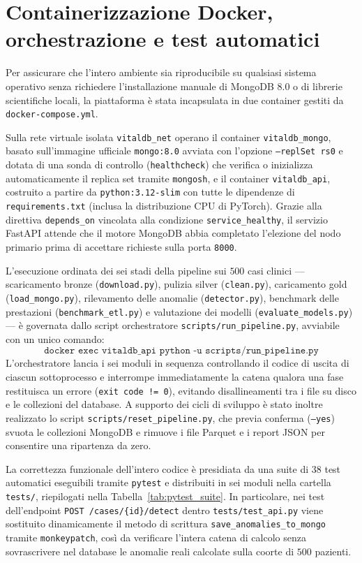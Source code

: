 \section{Containerizzazione Docker, orchestrazione e test automatici}
Per assicurare che l'intero ambiente sia riproducibile su qualsiasi sistema operativo senza richiedere l'installazione manuale di MongoDB 8.0 o di librerie scientifiche locali, la piattaforma \`e stata incapsulata in due container gestiti da \texttt{docker-compose.yml}.

Sulla rete virtuale isolata \texttt{vitaldb\_net} operano il container \texttt{vitaldb\_mongo}, basato sull'immagine ufficiale \texttt{mongo:8.0} avviata con l'opzione \texttt{--replSet rs0} e dotata di una sonda di controllo (\texttt{healthcheck}) che verifica o inizializza automaticamente il replica set tramite \texttt{mongosh}, e il container \texttt{vitaldb\_api}, costruito a partire da \texttt{python:3.12-slim} con tutte le dipendenze di \texttt{requirements.txt} (inclusa la distribuzione CPU di PyTorch). Grazie alla direttiva \texttt{depends\_on} vincolata alla condizione \texttt{service\_healthy}, il servizio FastAPI attende che il motore MongoDB abbia completato l'elezione del nodo primario prima di accettare richieste sulla porta \texttt{8000}.

L'esecuzione ordinata dei sei stadi della pipeline sui $500$ casi clinici — scaricamento bronze (\texttt{download.py}), pulizia silver (\texttt{clean.py}), caricamento gold (\texttt{load\_mongo.py}), rilevamento delle anomalie (\texttt{detector.py}), benchmark delle prestazioni (\texttt{benchmark\_etl.py}) e valutazione dei modelli (\texttt{evaluate\_models.py}) — \`e governata dallo script orchestratore \texttt{scripts/run\_pipeline.py}, avviabile con un unico comando:
$$\texttt{docker exec vitaldb\_api python -u scripts/run\_pipeline.py}$$
L'orchestratore lancia i sei moduli in sequenza controllando il codice di uscita di ciascun sottoprocesso e interrompe immediatamente la catena qualora una fase restituisca un errore (\texttt{exit code != 0}), evitando disallineamenti tra i file su disco e le collezioni del database. A supporto dei cicli di sviluppo \`e stato inoltre realizzato lo script \texttt{scripts/reset\_pipeline.py}, che previa conferma (\texttt{--yes}) svuota le collezioni MongoDB e rimuove i file Parquet e i report JSON per consentire una ripartenza da zero.

La correttezza funzionale dell'intero codice \`e presidiata da una suite di 38 test automatici eseguibili tramite \texttt{pytest} e distribuiti in sei moduli nella cartella \texttt{tests/}, riepilogati nella Tabella~\ref{tab:pytest_suite}. In particolare, nei test dell'endpoint \texttt{POST /cases/\{id\}/detect} dentro \texttt{tests/test\_api.py} viene sostituito dinamicamente il metodo di scrittura \texttt{save\_anomalies\_to\_mongo} tramite \texttt{monkeypatch}, cos\`i da verificare l'intera catena di calcolo senza sovrascrivere nel database le anomalie reali calcolate sulla coorte di $500$ pazienti.

